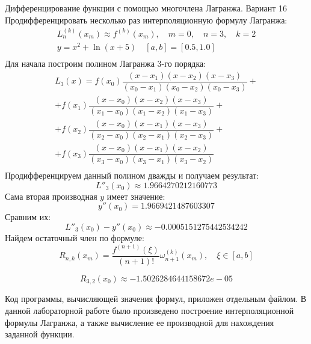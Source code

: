 \documentclass[14pt, a4paper, fleqn]{extarticle}
\begin{document}
	\tableofcontents
	\pagebreak
	Дифференцирование функции с помощью многочлена Лагранжа. Вариант 16
	Продифференцировать несколько раз интерполяционную формулу Лагранжа:
	\begin{multline*}
	L^{(k)}_n(x_m) \approx f^{(k)}(x_m), \quad m=0, \quad n=3, \quad k=2 \\
	y = x^2 + \ln(x + 5) \quad [a,b] = [0.5, 1.0] \\
	\end{multline*}
	Для начала построим полином Лагранжа 3-го порядка:
	\begin{multline*}
		L_3(x) = f(x_0)\dfrac{(x-x_1)(x-x_2)(x-x_3)}{(x_0-x_1)(x_0-x_2)(x_0-x_3)} + \\		+f(x_1)\dfrac{(x-x_0)(x-x_2)(x-x_3)}{(x_1-x_0)(x_1-x_2)(x_1-x_3)} +\\
		+f(x_2)\dfrac{(x-x_0)(x-x_1)(x-x_3)}{(x_2-x_0)(x_2-x_1)(x_2-x_3)} +\\
		+f(x_3)\dfrac{(x-x_0)(x-x_1)(x-x_2)}{(x_3-x_0)(x_3-x_1)(x_3-x_2)} \\
	\end{multline*}
	Продифференцируем данный полином дважды и получаем результат:
	\[
	L''_3(x_0) \approx 1.9664270212160773
	\]
	Сама вторая производная $y$ имеет значение:
	\[
	y''(x_0) = 1.9669421487603307
	\]
	Сравним их:
	\[
	L''_3(x_0) - y''(x_0) \approx -0.0005151275442534242
	\]
	Найдем остаточный член по формуле:
	\[
	R_{n, k}(x_m) = \dfrac{f^{(n+1)}(\xi)}{(n+1)!}\omega^{(k)}_{n+1}(x_m), \quad \xi \in [a, b]
	\]
	
	\[
	R_{3, 2}(x_0) \approx -1.5026284644158672e-05
	\]
	
	Код программы, вычисляющей значения формул, приложен отдельным файлом.
	В данной лабораторной работе было произведено построение интерполяционной формулы Лагранжа, а также вычисление ее производной для нахождения заданной функции.
		
\end{document}
